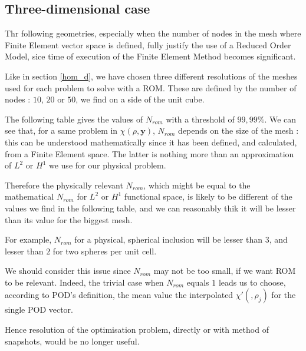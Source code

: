 \subsection{Three-dimensional case}

Thr following geometries, especially when the number of nodes in the mesh where Finite Element vector space is defined, fully justify the use of a Reduced Order Model, %
sice time of execution of the Finite Element Method becomes significant.

\par
Like in section \ref{hom_d}, we have chosen three different resolutions of the meshes used for each problem to solve with a ROM. %
These are defined by the number of nodes : $10$, $20$ or $50$, we find on a side of the unit cube.

\par
The following table gives the values of $N_{rom}$ with a threshold of $99,99\%$. We can see that, for a same problem in $\chi (\rho ,\mathbf{y})$, %
$N_{rom}$ depends on the size of the mesh : %
this can be understood mathematically since it has been defined, and calculated, from a Finite Element space. %
The latter is nothing more than an approximation of $L^2$ or $H^1$ we use for our physical problem.

\par
Therefore the physically relevant $N_{rom}$, which might be equal to the mathematical $N_{rom}$ for $L^2$ or $H^1$ functional space, %
is likely to be different of the values we find in the following table, %
and we can reasonably thik it will be lesser than its value for the biggest mesh.

\par
For example, $N_{rom}$ for a physical, spherical inclusion will be lesser than $3$, and lesser than $2$ for two spheres per unit cell.

\par
We should consider this issue since $N_{rom}$ may not be too small, if we want ROM to be relevant. %
Indeed, the trivial case when $N_{rom}$ equals $1$ leads us to choose, according to POD's definition, %
the mean value the interpolated $\chi '(,\rho_j)$ for the single POD vector.

\par
Hence resolution of the optimisation problem, directly or with method of snapshots, would be no longer useful.

